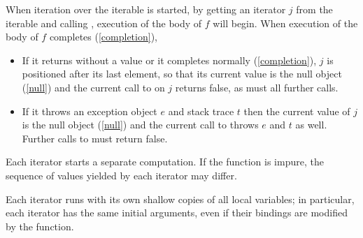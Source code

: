 \documentclass{article}
\begin{document}
\LMHash{}
When iteration over the iterable is started, by getting an iterator $j$ from the iterable and calling , execution of the body of $f$ will begin.
When execution of the body of $f$ completes (\ref{completion}),
\begin{itemize}
\item If it returns without a value or it completes normally (\ref{completion}), $j$ is positioned after its last element, so that its current value is the null object (\ref{null}) and the current call to  on $j$ returns false, as must all further calls.
\item If it throws an exception object $e$ and stack trace $t$ then the current value of $j$ is the null object (\ref{null}) and the current call to  throws $e$ and $t$ as well.
Further calls to  must return false.
\end{itemize}

Each iterator starts a separate computation.
If the \SYNC* function is impure, the sequence of values yielded by each iterator may differ.


\LMHash{}
Each iterator runs with its own shallow copies of all local variables; in particular, each iterator has the same initial arguments, even if their bindings are modified by the function.
\end{document}
